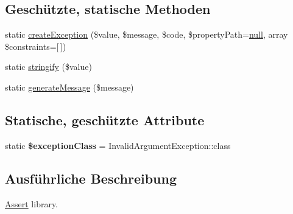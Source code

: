 \subsection*{Geschützte, statische Methoden}
\begin{DoxyCompactItemize}
\item 
static \mbox{\hyperlink{class_assert_1_1_assertion_ac297fe5149eaf4dd4fe8f6aeaacaf81b}{create\+Exception}} (\$value, \$message, \$code, \$property\+Path=\mbox{\hyperlink{class_assert_1_1_assertion_af95d8b1582dd619cc0159041bc6892c5}{null}}, array \$constraints=\mbox{[}$\,$\mbox{]})
\item 
static \mbox{\hyperlink{class_assert_1_1_assertion_a811c7cf9ee426f14592c15b459c6090c}{stringify}} (\$value)
\item 
static \mbox{\hyperlink{class_assert_1_1_assertion_a1e860e72122b4f9b75d673dd74d33743}{generate\+Message}} (\$message)
\end{DoxyCompactItemize}
\subsection*{Statische, geschützte Attribute}
\begin{DoxyCompactItemize}
\item 
\mbox{\label{class_assert_1_1_assertion_af9763138ae96050928c3ee642122b3b1}} 
static {\bfseries \$exception\+Class} = Invalid\+Argument\+Exception\+::class
\end{DoxyCompactItemize}


\subsection{Ausführliche Beschreibung}
\mbox{\hyperlink{class_assert_1_1_assert}{Assert}} library.


